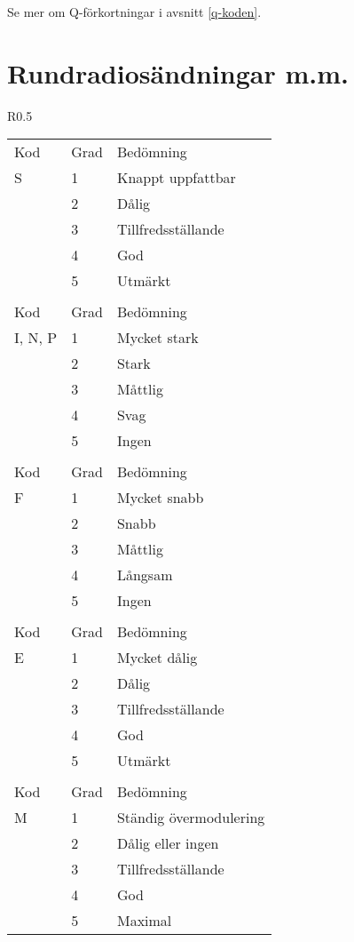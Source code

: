 Se mer om Q-förkortningar i avsnitt \ref{q-koden}.

\section{Rundradiosändningar m.m.}
\label{sinpo}

\begin{wraptable}{R}{0.5\textwidth}
\begin{tabular}{lll}
  Kod & Grad & Bedömning \\
  S   & 1    & Knappt uppfattbar \\
      & 2    & Dålig \\
      & 3    & Tillfredsställande \\
      & 4    & God \\
      & 5    & Utmärkt \\
  & & \\

  Kod     & Grad & Bedömning \\
  I, N, P & 1    & Mycket stark \\
          & 2    & Stark \\
          & 3    & Måttlig \\
          & 4    & Svag \\
          & 5    & Ingen \\
  & & \\

  Kod & Grad & Bedömning \\
  F   & 1    & Mycket snabb \\
      & 2    & Snabb \\
      & 3    & Måttlig \\
      & 4    & Långsam \\
      & 5    & Ingen \\

  & & \\
  Kod & Grad & Bedömning \\
  E   & 1    & Mycket dålig \\
      & 2    & Dålig \\
      & 3    & Tillfredsställande \\
      & 4    & God \\
      & 5    & Utmärkt \\

  & & \\
  Kod & Grad & Bedömning \\
  M   & 1    & Ständig övermodulering \\
      & 2    & Dålig eller ingen \\
      & 3    & Tillfredsställande \\
      & 4    & God \\
      & 5    & Maximal \\


\end{tabular}
\end{wraptable}
